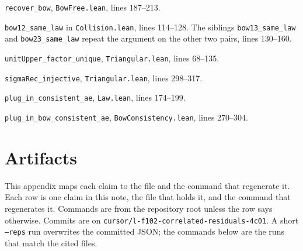 \documentclass[11pt]{article}
\begin{document}
\medskip
\noindent\texttt{recover\_bow}, \texttt{BowFree.lean}, lines 187--213.


\medskip
\noindent\texttt{bow12\_same\_law} in \texttt{Collision.lean}, lines 114--128.
The siblings \texttt{bow13\_same\_law} and \texttt{bow23\_same\_law} repeat
the argument on the other two pairs, lines 130--160.


\medskip
\noindent\texttt{unitUpper\_factor\_unique}, \texttt{Triangular.lean}, lines 68--135.


\medskip
\noindent\texttt{sigmaRec\_injective}, \texttt{Triangular.lean}, lines 298--317.


\medskip
\noindent\texttt{plug\_in\_consistent\_ae}, \texttt{Law.lean}, lines 174--199.


\medskip
\noindent\texttt{plug\_in\_bow\_consistent\_ae}, \texttt{BowConsistency.lean}, lines 270--304.


\section{Artifacts}
\label{app:artifacts}

This appendix maps each claim to the file and the command that regenerate
it. Each row is one claim in this note, the file that holds it, and the command
that regenerates it. Commands are from the repository root unless the row
says otherwise. Commits are on
\texttt{cursor/l-f102-correlated-residuals-4c01}. A short \texttt{--reps}
run overwrites the committed JSON; the commands below are the runs that
match the cited files.
\end{document}

